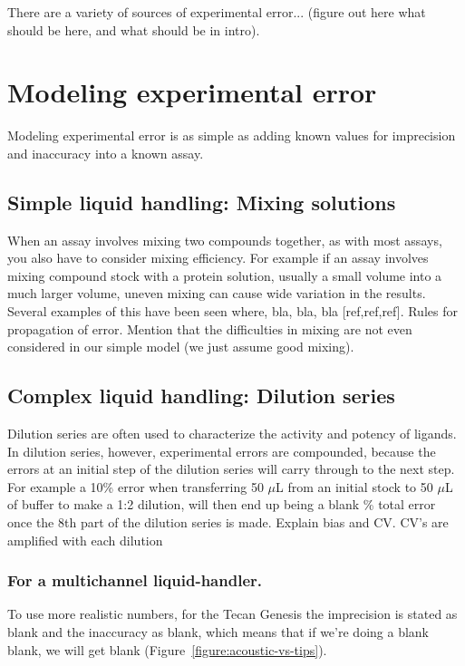 \documentclass[aps,pre,twocolumn,nofootinbib,superscriptaddress,linenumbers]{revtex4-1}
\begin{document}
There are a variety of sources of experimental error... (figure out here what should be here, and what should be in intro).


\section*{Modeling experimental error}

Modeling experimental error is as simple as adding known values for imprecision and inaccuracy into a known assay. 

\subsection*{Simple liquid handling: Mixing solutions}

When an assay involves mixing two compounds together, as with most assays, you also have to consider mixing efficiency. For example if an assay involves mixing compound stock with a protein solution, usually a small volume into a much larger volume, uneven mixing can cause wide variation in the results. Several examples of this have been seen where, bla, bla, bla [ref,ref,ref]. Rules for propagation of error. Mention that the difficulties in mixing are not even considered in our simple model (we just assume good mixing).

\subsection*{Complex liquid handling: Dilution series}

Dilution series are often used to characterize the activity and potency of ligands. In dilution series, however, experimental errors are compounded, because the errors at an initial step of the dilution series will carry through to the next step. For example a 10\% error when transferring 50 $\mu$L from an initial stock to 50 $\mu$L of buffer to make a 1:2 dilution, will then end up being a blank \% total error once the 8th part of the dilution series is made. Explain bias and CV. CV's are amplified with each dilution

\subsubsection*{For a multichannel liquid-handler.}

To use more realistic numbers, for the Tecan Genesis the imprecision is stated as blank and the inaccuracy as blank, which means that if we're doing a blank blank, we will get blank (Figure~\ref{figure:acoustic-vs-tips}).  
\end{document}
